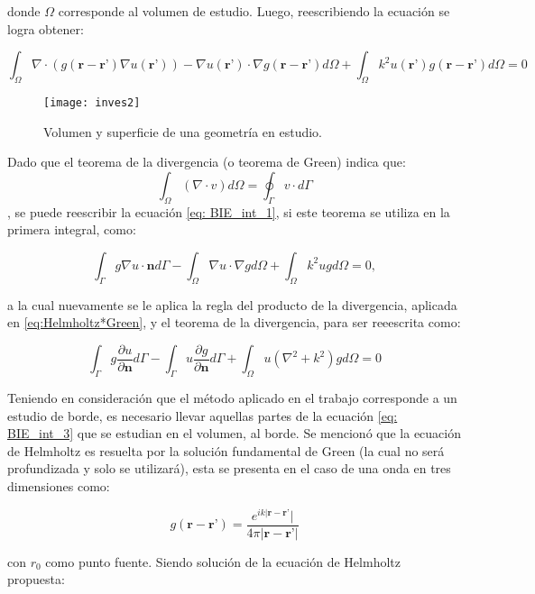 \documentclass[12pt,letterpaper]{article}
\numberwithin{equation}{section}
\begin{document}
\noindent donde $\Omega$ corresponde al volumen de estudio. Luego, reescribiendo la ecuación se logra obtener:

\begin{equation}
\int_{\Omega}\nabla\cdot (g(\textbf{r}-\textbf{r'})\nabla u(\textbf{r'}))-\nabla u(\textbf{r'})\cdot\nabla g(\textbf{r}-\textbf{r'}) d\varOmega+\int_{\Omega}k^2u(\textbf{r'})g(\textbf{r}-\textbf{r'})d\varOmega=0
\label{eq: BIE_int_1}
\end{equation}

\begin{figure}[H]
	\centering
	\texttt{[image: inves2]}
	\caption{Volumen y superficie de una geometría en estudio. }
\end{figure}


Dado que el teorema de la divergencia (o teorema de Green) indica que: $$\int_{\Omega}(\nabla\cdot v)d\varOmega=\oint_{\Gamma}v\cdot d\varGamma$$, 
\noindent se puede reescribir la ecuación \ref{eq: BIE_int_1}, si este teorema se utiliza en la primera integral, como:

\begin{equation}
\int_{\Gamma}g\nabla u\cdot\textbf{n}d\varGamma-\int_{\Omega}\nabla u\cdot\nabla g d\varOmega+\int_{\Omega}k^2ugd\varOmega=0,
\label{eq: BIE_int_2}
\end{equation}

\noindent a la cual nuevamente se le aplica la regla del producto de la divergencia, aplicada en \ref{eq:Helmholtz*Green}, y el teorema de la divergencia, para ser reeescrita como:

\begin{equation}
\int_{\Gamma}g\frac{\partial u}{\partial\textbf{n}}d\varGamma-\int_{\Gamma}u\frac{\partial g}{\partial\textbf{n}}d\varGamma+\int_{\Omega}u(\nabla^2+k^2)gd\varOmega=0
\label{eq: BIE_int_3}
\end{equation}

Teniendo en consideración que el método aplicado en el trabajo corresponde a un estudio de borde, es necesario llevar aquellas partes de la ecuación \ref{eq: BIE_int_3} que se estudian en el volumen, al borde. 
Se mencionó que la ecuación de Helmholtz es resuelta por la solución fundamental de Green (la cual no será profundizada y solo se utilizará), esta se presenta en el caso de una onda en tres dimensiones como: 

$$g(\textbf{r}-\textbf{r'})=\frac{e^{ik|\textbf{r}-\textbf{r'}}|}{4\pi |\textbf{r}-\textbf{r'}|}$$

\noindent con $r_{0}$ como punto fuente. Siendo solución de la ecuación de Helmholtz propuesta:
\end{document}
